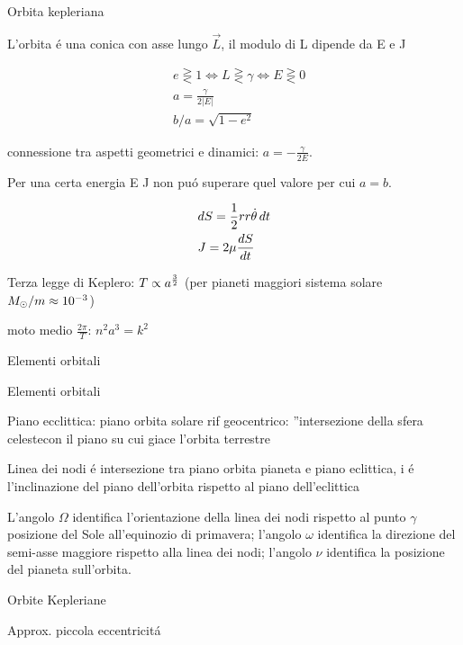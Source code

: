 \begin{wordonframe}{Orbita kepleriana}

L'orbita \'e una conica con asse lungo $\vec{L}$, il modulo di L dipende da E e J

\begin{align*}
&e\gtreqless1\Leftrightarrow L\gtreqless\gamma\Leftrightarrow E\gtreqless0\\
&a=\frac{\gamma}{2|E|}\\
&b/a=\sqrt{1-e^2}
\end{align*}

connessione tra aspetti geometrici e dinamici: $a=-\frac{\gamma}{2E}$.

Per una certa energia E J non pu\'o superare quel valore per cui $a=b$.

\begin{align*}
&dS=\frac{1}{2}rr\dot{\theta}\,dt\\
&J=2\mu\TDy{t}{S}
\end{align*}

Terza legge di Keplero: $T\propto a\expy{\frac{3}{2}}$ (per pianeti maggiori sistema solare $\msun{}/m\approx\num{e-3}$)

moto medio $\frac{2\pi}{T}$: $n^2a^3=k^2$

\end{wordonframe}


\begin{frame}{Elementi orbitali}



\end{frame}



\begin{wordonframe}{Elementi orbitali}

Piano ecclittica: piano orbita solare rif geocentrico: ''intersezione della sfera celestecon il piano su cui giace l'orbita terrestre

Linea dei nodi \'e intersezione tra piano orbita pianeta e piano eclittica, i \'e l'inclinazione del piano dell'orbita rispetto al piano dell'eclittica

L'angolo $\Omega$ identifica l'orientazione della linea dei nodi rispetto al punto $\gamma$ posizione del Sole all'equinozio di primavera; l'angolo $\omega$ identifica la direzione del semi-asse maggiore rispetto alla linea dei nodi; l'angolo $\nu$ identifica la posizione del pianeta sull'orbita.

\end{wordonframe}


\begin{frame}{Orbite Kepleriane}

\end{frame}

\begin{frame}{Approx. piccola eccentricit\'a}

\end{frame}

